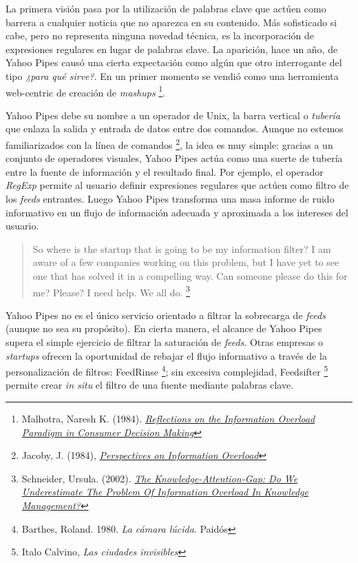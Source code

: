 \documentclass[12pt, a4paper,twoside]{book}
\begin{document}
La primera visión pasa por la utilización de palabras clave que
actúen como barrera a cualquier noticia que no aparezca en su
contenido. Más sofisticado si cabe, pero no representa ninguna
novedad técnica, es la incorporación de expresiones regulares en
lugar de palabras clave. La aparición, hace un año, de Yahoo Pipes
causó una cierta expectación como algún que otro interrogante del
tipo \emph{¿para qué sirve?}. En un primer momento se vendió como
una herramienta web-centric de creación de \emph{mashups}%
\footnote{Malhotra, Naresh K. (1984).
\emph{\href{http://www.jstor.org/pss/2488913}{Reflections on the Information Overload Paradigm in Consumer Decision Making}}}.

Yahoo Pipes debe su nombre a un operador de Unix, la barra vertical
o \emph{tubería} que enlaza la salida y entrada de datos entre dos
comandos. Aunque no estemos familiarizados con la línea de
comandos%
\footnote{Jacoby, J. (1984),
\emph{\href{http://www.jstor.org/pss/2488912}{Perspectives on Information Overload}}},
la idea es muy simple: gracias a un conjunto de operadores
visuales, Yahoo Pipes actúa como una suerte de tubería entre la
fuente de información y el resultado final. Por ejemplo, el
operador \emph{RegExp} permite al usuario definir expresiones
regulares que actúen como filtro de los \emph{feeds} entrantes.
Luego Yahoo Pipes transforma una masa informe de ruido informativo
en un flujo de información adecuada y aproximada a los intereses
del usuario.

\begin{quote}
So where is the startup that is going to be my information filter?
I am aware of a few companies working on this problem, but I have
yet to see one that has solved it in a compelling way. Can someone
please do this for me? Please? I need help. We all do.%
\footnote{Schneider, Ursula. (2002).
\emph{\href{http://www.jucs.org/jucs_8_5/the_knowledge_attention_gap/Schneider_U.html}{The Knowledge-Attention-Gap: Do We Underestimate The Problem Of Information Overload In Knowledge Management?}}}

\end{quote}
Yahoo Pipes no es el único servicio orientado a filtrar la
sobrecarga de \emph{feeds} (aunque no sea su propósito). En cierta
manera, el alcance de Yahoo Pipes supera el simple ejercicio de
filtrar la saturación de \emph{feeds}. Otras empresas o
\emph{startups} ofrecen la oportunidad de rebajar el flujo
informativo a través de la personalización de filtros: FeedRinse%
\footnote{Barthes, Roland. 1980. \emph{La cámara lúcida}. Paidós};
sin excesiva complejidad, Feedsifter%
\footnote{Italo Calvino, \emph{Las ciudades invisibles}}
permite crear \emph{in situ} el filtro de una fuente mediante
palabras clave.
\end{document}
